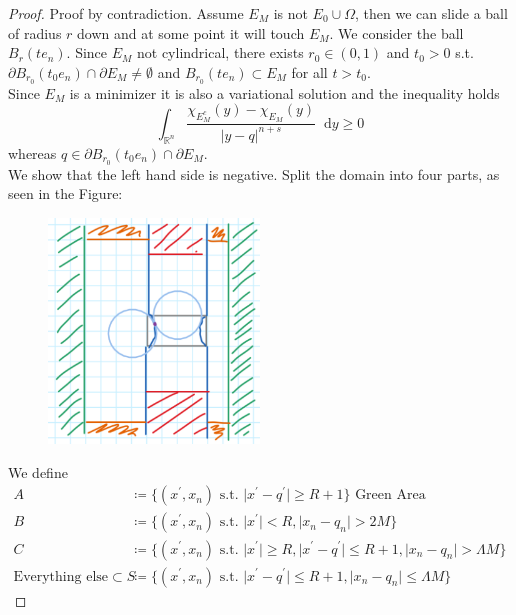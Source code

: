 \documentclass[11pt]{article}
\newcommand*{\dd}[1]{\mathop{}\!\mathrm{d}#1} %
\begin{document}
\begin{proof}
	Proof by contradiction. Assume \( E_M \) is not \( E_0 \cup \Omega \), then we
	can slide a ball of radius \( r \) down and at some point it will touch \( E_M \).
	We consider the ball \( B_r (t e_n) \). Since \( E_M \) not cylindrical, there
	exists \( r_0 \in (0,1) \) and \( t_0 > 0 \) s.t.\ \( \partial B_{r_0}(t_0
	e_n) \cap \partial E_M \neq \emptyset \) and \( B_{r_0}(t e_n) \subset E_M
	\) for all \( t > t_0 \). \\
	Since \( E_M \) is a minimizer it is also a variational solution and the
	inequality holds
	\[
		\int_{\mathbb{R}^n} \frac{\chi_{E_M^c}(y)-\chi_{E_M} (y)}{\lvert y-q\rvert^{n+s}} \dd{y} \geq 0
	\]
	whereas \( q \in \partial B_{r_0}(t_0 e_n) \cap \partial E_M \). \\
	We show that the left hand side is negative. Split the domain into four parts, as seen
	in the Figure:
	\begin{figure}[h]
		\centering
		\includegraphics[width = 0.5\textwidth]{figures/Screenshot_20240105_020915.png}
		\caption{}
		\label{fig:001}
	\end{figure}
	\par
	We define
	\begin{align*}
		A                                & \coloneqq \{ (x^\prime,x_n) \text{ s.t. } \lvert x^\prime -q^\prime \rvert \geq R+1\} \text{ Green Area} \\
		B                                & \coloneqq \{ (x^\prime,x_n) \text{ s.t. } \lvert x^\prime \rvert < R, \lvert x_n -q_n \rvert > 2M \} \\
		C                                & \coloneqq \{ (x^\prime,x_n) \text{ s.t. } \lvert x^\prime \rvert \geq R, \lvert x^\prime - q^\prime \rvert \leq R+1, \lvert x_n -q_n \rvert > \Lambda M \} \\
		\text{Everything else} \subset S & \coloneqq \{(x^\prime,x_n) \text{ s.t. } \lvert x^\prime -q^\prime \rvert \leq R+1, \lvert x_n -q_n \rvert \leq \Lambda M \}
	\end{align*}



\end{proof}
\end{document}
